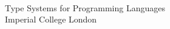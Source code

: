 
\begin{titlepage}


    \begin{flushright}
         \\
        \vspace{4mm}
        \moduletitlefont Type Systems for Programming Languages \\
        \vspace{1mm}
        \imperialfont Imperial College London
    \end{flushright}
\end{titlepage}

